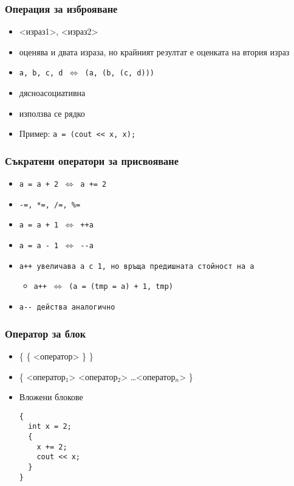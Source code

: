 \documentclass{beamer}
\begin{document}
\begin{frame}
  \frametitle{Операция за изброяване}

  \begin{itemize}
  \item{} <израз1>\tta, <израз2>
  \item оценява и двата израза, но крайният резултат е оценката на втория израз
  \item \tt{a, b, c, d} $\Leftrightarrow$ \tt{(a, (b, (c, d)))}
  \item \alert{дясноасоциативна}
  \item използва се рядко
  \item Пример: \lstinline{a = (cout << x, x);}
  \end{itemize}
\end{frame}

\begin{frame}
  \frametitle{Съкратени оператори за присвояване}

  \begin{itemize}[<+->]
  \item \tt{a = a + 2} $\Leftrightarrow$ \tt{a += 2}
  \item \tt{-=}, \tt{*=}, \tt{/=}, \tt{\%=}
  \item \tt{a = a + 1}  $\Leftrightarrow$ \tt{++a}
  \item \tt{a = a - 1}  $\Leftrightarrow$ \tt{-{}-a}
  \item \tt{a++} увеличава a с 1, но връща предишната стойност на \tt a
    \begin{itemize}
    \item \tt{a++} $\Leftrightarrow$ \tt{(a = (tmp = a) + 1, tmp)}
    \end{itemize}
  \item \tt{a-{}-} действа аналогично
  \end{itemize}
\end{frame}

\begin{frame}[fragile]
  \frametitle{Оператор за блок}

  \begin{itemize}[<+->]
  \item \tta\{ \{ <оператор> \} \tta\}
  \item \tta\{ <оператор$_1$> <оператор$_2$> \ldots <оператор$_n$> \tta\}
  \item Вложени блокове\\
\begin{lstlisting}
{
  int x = 2;
  {
    x += 2;
    cout << x;
  }
}
\end{lstlisting}
  \end{itemize}
\end{frame}
\end{document}
